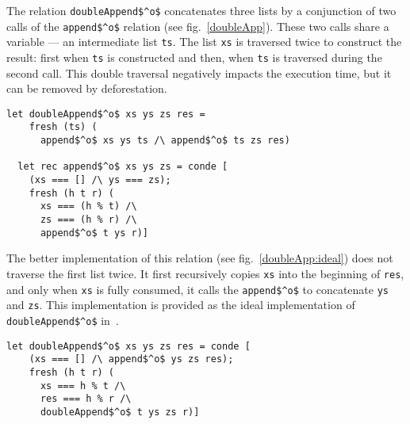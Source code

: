 The relation \lstinline{doubleAppend$^o$} concatenates three lists by a conjunction of two calls of the \lstinline{append$^o$} relation (see fig.~\ref{doubleApp}).
These two calls share a variable --- an intermediate list \lstinline{ts}.
The list \lstinline{xs} is traversed twice to construct the result: first when \lstinline{ts} is constructed and then, when \lstinline{ts} is traversed during the second call.
This double traversal negatively impacts the execution time, but it can be removed by deforestation.

\begin{figure*}[!h]
  \centering
  \begin{minipage}{0.6\textwidth}
    \begin{lstlisting}[label={doubleApp}, caption={Concatenation of three lists}, captionpos=b, frame=tb]
  let doubleAppend$^o$ xs ys zs res =
    fresh (ts) (
      append$^o$ xs ys ts /\ append$^o$ ts zs res)

  let rec append$^o$ xs ys zs = conde [
    (xs === [] /\ ys === zs);
    fresh (h t r) (
      xs === (h % t) /\
      zs === (h % r) /\
      append$^o$ t ys r)]
    \end{lstlisting}
  \end{minipage}
\end{figure*}

The better implementation of this relation (see fig.~\ref{doubleApp:ideal}) does not traverse the first list twice.
It first recursively copies \lstinline{xs} into the beginning of \lstinline{res}, and only when \lstinline{xs} is fully consumed, it calls the \lstinline{append$^o$} to concatenate \lstinline{ys} and \lstinline{zs}.
This implementation is provided as the ideal implementation of \lstinline{doubleAppend$^o$} in~\cite{de1999conjunctive}.

\begin{figure*}[!h]
  \centering
  \begin{minipage}{0.6\textwidth}
    \begin{lstlisting}[label={doubleApp:ideal}, caption={Ideal implementation of concatenation of three lists}, captionpos=b, frame=tb]
  let doubleAppend$^o$ xs ys zs res = conde [
    (xs === [] /\ append$^o$ ys zs res);
    fresh (h t r) (
      xs === h % t /\
      res === h % r /\
      doubleAppend$^o$ t ys zs r)]
    \end{lstlisting}
  \end{minipage}
\end{figure*}

